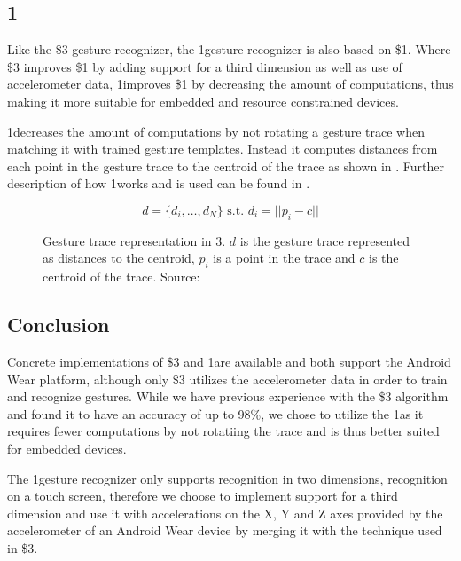 \subsection{1\textcent}

Like the \$3 gesture recognizer, the 1\textcent gesture recognizer is also based on \$1. Where \$3 improves \$1 by adding support for a third dimension as well as use of accelerometer data, 1\textcent improves \$1 by decreasing the amount of computations, thus making it more suitable for embedded and resource constrained devices.

1\textcent decreases the amount of computations by not rotating a gesture trace when matching it with trained gesture templates. Instead it computes distances from each point in the gesture trace to the centroid of the trace as shown in .
Further description of how 1\textcent works and is used can be found in .

\begin{figure}[h]
\[ d = \{d_i,\ldots,d_N\} \text{ s.t. } d_i=||p_i-c|| \]
\caption{Gesture trace representation in 3\textcent. $d$ is the gesture trace represented as distances to the centroid, $p_i$ is a point in the trace and $c$ is the centroid of the trace. Source: \cite{herold20121}}
\label{eq:one-cent-trace}
\end{figure}

\subsection{Conclusion}

Concrete implementations of \$3 and 1\textcent are available and both support the Android Wear platform, although only \$3 utilizes the accelerometer data in order to train and recognize gestures. While we have previous experience with the \$3 algorithm and found it to have an accuracy of up to 98\%, we chose to utilize the 1\textcent as it requires fewer computations by not rotatiing the trace and is thus better suited for embedded devices.

The 1\textcent gesture recognizer only supports recognition in two dimensions, \eg recognition on a touch screen, therefore we choose to implement support for a third dimension and use it with accelerations on the X, Y and Z axes provided by the accelerometer of an Android Wear device by merging it with the technique used in \$3.

